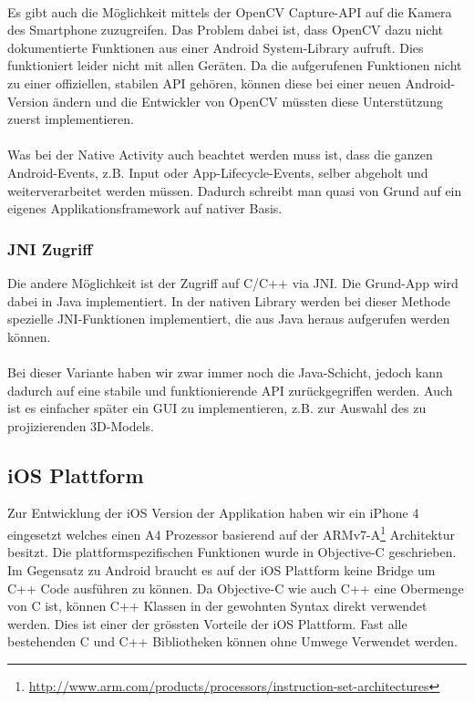\documentclass[main.tex]{subfiles}
\begin{document}
\paragraph{}
Es gibt auch die Möglichkeit mittels der OpenCV Capture-API auf die Kamera des Smartphone zuzugreifen. Das Problem dabei ist, dass OpenCV dazu nicht dokumentierte Funktionen aus einer Android System-Library aufruft. Dies funktioniert leider nicht mit allen Geräten. Da die aufgerufenen Funktionen nicht zu einer offiziellen, stabilen API gehören, können diese bei einer neuen Android-Version ändern und die Entwickler von OpenCV müssten diese Unterstützung zuerst implementieren.

\paragraph{}
Was bei der Native Activity auch beachtet werden muss ist, dass die ganzen Android-Events, z.B. Input oder App-Lifecycle-Events, selber abgeholt und weiterverarbeitet werden müssen. Dadurch schreibt man quasi von Grund auf ein eigenes Applikationsframework auf nativer Basis.


\subsubsection{JNI Zugriff}
Die andere Möglichkeit ist der Zugriff auf C/C++ via JNI. Die Grund-App wird dabei in Java implementiert. In der nativen Library werden bei dieser Methode spezielle JNI-Funktionen implementiert, die aus Java heraus aufgerufen werden können.

\paragraph{}
Bei dieser Variante haben wir zwar immer noch die Java-Schicht, jedoch kann dadurch auf eine stabile und funktionierende API zurückgegriffen werden. Auch ist es einfacher später ein GUI zu implementieren, z.B. zur Auswahl des zu projizierenden 3D-Models.


\subsection{iOS Plattform}
Zur Entwicklung der iOS Version der Applikation haben wir ein iPhone 4 eingesetzt welches einen A4 Prozessor basierend auf der ARMv7-A\footnote{\url{http://www.arm.com/products/processors/instruction-set-architectures}} Architektur besitzt. Die plattformspezifischen Funktionen wurde in Objective-C geschrieben. Im Gegensatz zu Android braucht es auf der iOS Plattform keine Bridge um C++ Code ausführen zu können. Da Objective-C wie auch C++ eine Obermenge von C ist, können C++ Klassen in der gewohnten Syntax direkt verwendet werden. Dies ist einer der grössten Vorteile der iOS Plattform. Fast alle bestehenden C und C++ Bibliotheken können ohne Umwege Verwendet werden.
\end{document}
